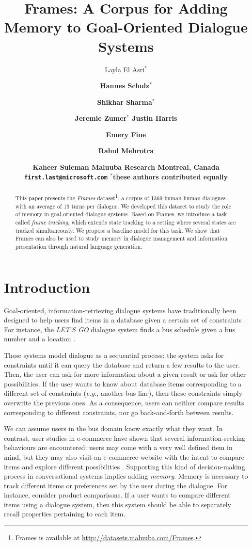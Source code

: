 \documentclass{article}
\title{Frames: A Corpus for Adding Memory to Goal-Oriented Dialogue Systems}
\author{Layla El Asri$^*$ \and \bf Hannes Schulz$^*$ \and \bf Shikhar Sharma$^*$ \and \bf Jeremie Zumer$^*$
    \And Justin Harris \and \bf Emery Fine \and \bf Rahul Mehrotra \and \bf Kaheer Suleman
    \vspace*{3mm}
    \AND Maluuba Research \AND Montreal, Canada \AND \texttt{first.last@microsoft.com}
    \AND \bf $^*$these authors contributed equally}
\theoremstyle{definition}
\newcommand{\ndialogues}{1369}
\begin{document}
\maketitle
\begin{abstract}

This paper presents the \emph{Frames} dataset\footnote{Frames is available at \url{http://datasets.maluuba.com/Frames}.}, a corpus of \ndialogues{} human-human dialogues with an average of 15 turns per dialogue. We developed this dataset to study the role of memory in goal-oriented dialogue systems. Based on Frames, we introduce a task called \emph{frame tracking}, which extends state tracking to a setting where several states are tracked simultaneously. We propose a baseline model for this task. We show that Frames can also be used to study memory in dialogue management and information presentation through natural language generation.

\end{abstract}

\section{Introduction}
Goal-oriented, information-retrieving dialogue systems have traditionally been designed to help users find items in a database given a certain set of constraints \citep{Singh:02,Raux:03,ElAsri:14,classicFinal}. For instance, the \textit{LET'S GO} dialogue system finds a bus schedule given a bus number and a location \citep{Raux:03}.

These systems model dialogue as a sequential process: the system asks for constraints until it can query the database and return a few results to the user. Then, the user can ask for more information about a given result or ask for other possibilities. If the user wants to know about database items corresponding to a different set of constraints (\textit{e.g.}, another bus line), then these constraints simply overwrite the previous ones. As a consequence, users can neither compare results corresponding to different constraints, nor go back-and-forth between results. 

We can assume users in the bus domain know exactly what they want. In contrast, user studies in e-commerce have shown that several information-seeking behaviours are encountered: users may come with a very well defined item in mind, but they may also visit an e-commerce website with the intent to compare items and explore different possibilities \citep{Moe:01}. Supporting this kind of decision-making process in conversational systems implies adding \emph{memory}. Memory is necessary to track different items or preferences set by the user during the dialogue. For instance, consider product comparisons. If a user wants to compare different items using a dialogue system, then this system should be able to separately recall properties pertaining to each item.
\end{document}
